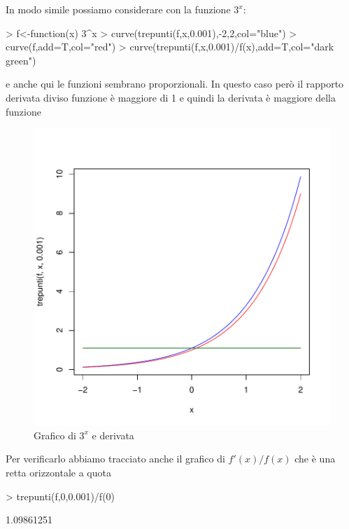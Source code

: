 \documentclass[onecolumn,11pt]{book}
\begin{document}
In modo simile possiamo considerare con la funzione $3^x$:
\begin{Schunk}
\begin{Sinput}
> f<-function(x) 3^x
> curve(trepunti(f,x,0.001),-2,2,col="blue")
> curve(f,add=T,col="red")
> curve(trepunti(f,x,0.001)/f(x),add=T,col="dark green")
\end{Sinput}
\end{Schunk}
e anche qui  le funzioni sembrano proporzionali. In questo caso per\`o il rapporto derivata diviso funzione \`e  maggiore di 1 e quindi la derivata \`e maggiore della funzione
\begin{figure}[ htbp]
\begin{center}
\includegraphics{Rmatematica-131}
\caption{Grafico di $3^x$ e derivata}
\label{fig:der3x}
\end{center}
\end{figure}

Per verificarlo abbiamo tracciato anche il grafico di $f'(x)/f(x)$ che \`e una retta orizzontale a quota
\begin{Schunk}
\begin{Sinput}
> trepunti(f,0,0.001)/f(0)
\end{Sinput}
\begin{Soutput}
[1] 1.09861251
\end{Soutput}
\end{Schunk}
\end{document}
